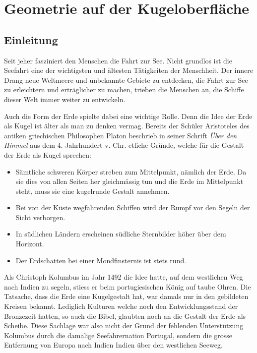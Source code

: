 \chapter{Geometrie auf der Kugeloberfläche\label{chapter:kugel}}
\begin{refsection}

\section{Einleitung}
Seit jeher fasziniert den Menschen die Fahrt zur See. Nicht grundlos
ist die Seefahrt eine der wichtigsten und ältesten Tätigkeiten der
Menschheit. Der innere Drang neue Weltmeere und unbekannte Gebiete
zu entdecken, die Fahrt zur See zu erleichtern und erträglicher zu
machen, trieben die Menschen an, die Schiffe dieser Welt immer
weiter zu entwickeln.

Auch die Form der Erde spielte dabei eine wichtige Rolle. Denn die
Idee der Erde als Kugel ist älter als man zu denken vermag. Bereits
der Schüler Aristoteles des antiken griechischen Philosophen Platon
beschrieb in seiner Schrift {\em Über den Himmel} aus dem 4.
Jahrhundert v. Chr. etliche Gründe, welche für die Gestalt der Erde
als Kugel sprechen:
\begin{itemize}
      \item Sämtliche schweren Körper streben zum Mittelpunkt,
      nämlich der Erde. Da sie dies von allen Seiten her gleichmässig
      tun und die Erde im Mittelpunkt steht, muss sie eine kugelrunde
      Gestalt annehmen.
      \item Bei von der Küste wegfahrenden Schiffen wird der Rumpf vor
      den Segeln der Sicht verborgen.
      \item In südlichen Ländern erscheinen südliche Sternbilder
      höher über dem Horizont.
      \item Der Erdschatten bei einer Mondfinsternis ist stets rund.
\end{itemize}
Als Christoph Kolumbus im Jahr 1492 die Idee hatte, auf dem westlichen
Weg nach Indien zu segeln, stiess er beim portugiesischen König auf
taube Ohren.
Die Tatsache, dass die Erde eine Kugelgestalt hat, war damals nur
in den gebildeten Kreisen bekannt. Lediglich Kulturen welche noch
den Entwicklungsstand der Bronzezeit hatten, so auch die Bibel,
glaubten noch an die Gestalt der Erde als Scheibe.
Diese Sachlage war also nicht der Grund der fehlenden Unterstützung
Kolumbus durch die damalige Seefahrernation Portugal,  sondern die
grosse Entfernung von Europa nach Indien Indien über den westlichen
Seeweg.


\end{refsection}
